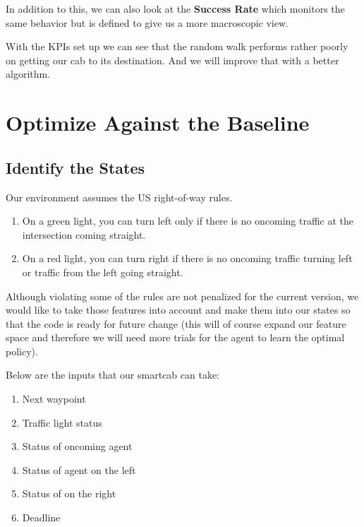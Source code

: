 \documentclass{article}
\providecommand{\tightlist}{%
      \setlength{\itemsep}{0pt}\setlength{\parskip}{0pt}}
\begin{document}
In addition to this, we can also look at the \textbf{Success Rate} which
monitors the same behavior but is defined to give us a more macroscopic
view.

With the KPIs set up we can see that the random walk performs rather
poorly on getting our cab to its destination. And we will improve that
with a better algorithm.

    \section{Optimize Against the
Baseline}\label{optimize-against-the-baseline}

\subsection{Identify the States}\label{identify-the-states}

Our environment assumes the US right-of-way rules.

\begin{enumerate}
\def\labelenumi{\arabic{enumi}.}
\tightlist
\item
  On a green light, you can turn left only if there is no oncoming
  traffic at the intersection coming straight.
\item
  On a red light, you can turn right if there is no oncoming traffic
  turning left or traffic from the left going straight.
\end{enumerate}

Although violating some of the rules are not penalized for the current
version, we would like to take those features into account and make them
into our states so that the code is ready for future change (this will
of course expand our feature space and therefore we will need more
trials for the agent to learn the optimal policy).

Below are the inputs that our smartcab can take:

\begin{enumerate}
\def\labelenumi{\arabic{enumi}.}
\tightlist
\item
  Next waypoint
\item
  Traffic light status
\item
  Status of oncoming agent
\item
  Status of agent on the left
\item
  Status of on the right
\item
  Deadline
\end{enumerate}
\end{document}
